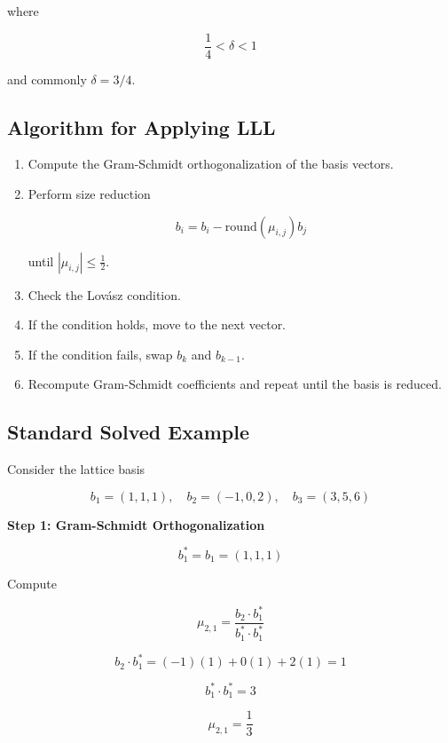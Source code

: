 \documentclass[12pt, a4paper]{article}
\theoremstyle{definition}
\theoremstyle{plain}
\begin{document}
where

\[
\frac{1}{4} < \delta < 1
\]

and commonly $\delta = 3/4$.

\subsection{Algorithm for Applying LLL}

\begin{enumerate}

\item Compute the Gram-Schmidt orthogonalization of the basis vectors.

\item Perform size reduction

\[
b_i = b_i - \text{round}(\mu_{i,j})b_j
\]

until $|\mu_{i,j}| \le \frac{1}{2}$.

\item Check the Lovász condition.

\item If the condition holds, move to the next vector.

\item If the condition fails, swap $b_k$ and $b_{k-1}$.

\item Recompute Gram-Schmidt coefficients and repeat until the basis is reduced.

\end{enumerate}

\subsection{Standard Solved Example}

Consider the lattice basis

\[
b_1=(1,1,1), \quad b_2=(-1,0,2), \quad b_3=(3,5,6)
\]

\textbf{Step 1: Gram-Schmidt Orthogonalization}

\[
b_1^* = b_1 = (1,1,1)
\]

Compute

\[
\mu_{2,1}=\frac{b_2\cdot b_1^*}{b_1^*\cdot b_1^*}
\]

\[
b_2\cdot b_1^* = (-1)(1)+0(1)+2(1)=1
\]

\[
b_1^*\cdot b_1^*=3
\]

\[
\mu_{2,1}=\frac{1}{3}
\]
\end{document}
